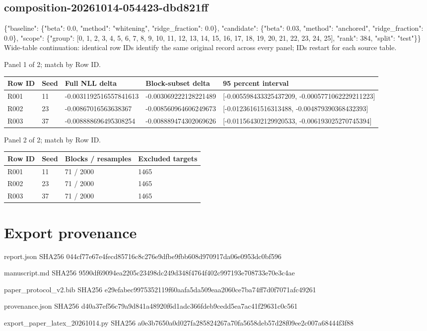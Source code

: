 \documentclass[10pt]{article}
\begin{document}
\subsection{composition-20261014-054423-dbd821ff}
\{"baseline": \{"beta": 0.0, "method": "whitening", "ridge\_fraction": 0.0\}, "candidate": \{"beta": 0.03, "method": "anchored", "ridge\_fraction": 0.0\}, "scope": \{"group": [0, 1, 2, 3, 4, 5, 6, 7, 8, 9, 10, 11, 12, 13, 14, 15, 16, 17, 18, 19, 20, 21, 22, 23, 24, 25], "rank": 384, "split": "test"\}\}
Wide-table continuation: identical row IDs identify the same original record across every panel; IDs restart for each source table.
\par\noindent Panel 1 of 2; match by Row ID.
{\scriptsize\setlength{\tabcolsep}{2pt}
\begin{longtable}{p{}p{}p{}p{}p{}}
Row ID & Seed & Full NLL delta & Block-subset delta & 95 percent interval \\
\hline\endhead
R001 & 11 & -0.0031192516557841613 & -0.003069222128221489 & [-0.005598433325437209, -0.0005771062229211223] \\
R002 & 23 & -0.00867016563638367 & -0.008560964606249673 & [-0.01236161516313488, -0.004879390368432393] \\
R003 & 37 & -0.008888696495308254 & -0.008889474302069626 & [-0.011564302129920533, -0.006193025270745394] \\
\end{longtable}}
\par\noindent Panel 2 of 2; match by Row ID.
{\scriptsize\setlength{\tabcolsep}{2pt}
\begin{longtable}{p{}p{}p{}p{}}
Row ID & Seed & Blocks / resamples & Excluded targets \\
\hline\endhead
R001 & 11 & 71 / 2000 & 1465 \\
R002 & 23 & 71 / 2000 & 1465 \\
R003 & 37 & 71 / 2000 & 1465 \\
\end{longtable}}
\section{Export provenance}
\par\noindent\small report.json SHA256 044cf77e67e4fecd85716c8c276e9dfbe9fbb608d970917da06e0953dc0bf596
\par\noindent\small manuscript.md SHA256 9590df69094ea2205c23498dc249d348f4764f402c997193e708733e70e3c4ae
\par\noindent\small paper\_protocol\_v2.bib SHA256 e29efabec9975352119f60aafa5da509eaa2060ce7ba74ff7d0f7071afc49261
\par\noindent\small provenance.json SHA256 d40a37ef56c79a9d841a48920f6d1adc366fdeb9cedd5ea7ac41f29631c0c561
\par\noindent\small export\_paper\_latex\_20261014.py SHA256 a0e3b7650a0d027fa285824267a70fa5658deb57d28f09ee2c007a68444f3f88
\end{document}
